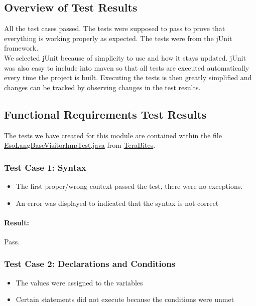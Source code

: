 \documentclass[english]{article}
\begin{document}
		\subsection{Overview of Test Results}

All the test cases passed. The tests were supposed to pass to prove that everything is working properly as expected. The tests were from the jUnit framework.\\

We selected jUnit because of simplicity to use and how it stays updated. jUnit was also easy to include into maven so that all tests are executed automatically every time the project is built. Executing the tests is then greatly simplified and changes can be tracked by observing changes in the test results.
		\subsection{Functional Requirements Test Results}
		The tests we have created for this module are contained within the file \href{https://github.com/Dzilafho/TeraBites/tree/master/Arcane%20Arcade%20Integrated/ArcaneArcade/src/test/java/com/mycompany/arcane/EsoLangBaseVisitorImpTest.java}{EsoLangBaseVisitorImpTest.java} from \href{https://github.com/Dzilafho/TeraBites}{TeraBites}.
		
			\subsubsection{Test Case 1: Syntax}
			\begin{itemize}
			\item The first proper/wrong context passed the test, there were no exceptions.\\
			
			\item An error was displayed to indicated that the syntax is not correct\\
			\end{itemize}
						\paragraph{Result: } Pass.

			\subsubsection{Test Case 2: Declarations and Conditions}
			\begin{itemize}
			\item The values were assigned to the variables\\
			
			\item Certain statements did not execute because the conditions were unmet\\
			\end{itemize}
\end{document}
